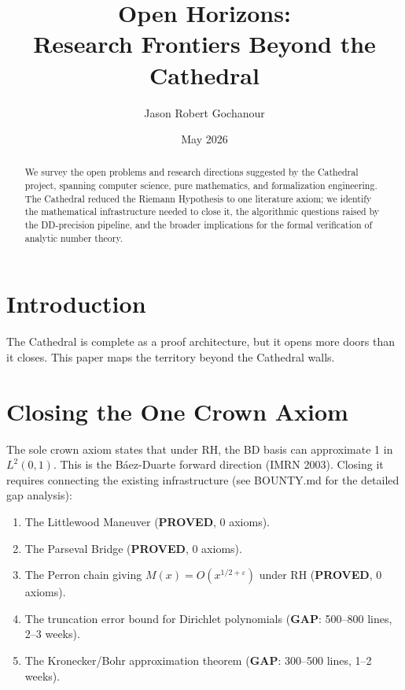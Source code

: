 \documentclass[11pt,a4paper]{article}
\title{%
  Open Horizons:\\
  Research Frontiers Beyond the Cathedral%
}
\author{Jason Robert Gochanour}
\date{May 2026}
\begin{document}
\maketitle

\begin{abstract}
We survey the open problems and research directions suggested by
the Cathedral project, spanning computer science, pure mathematics,
and formalization engineering. The Cathedral reduced the Riemann
Hypothesis to one literature axiom; we identify the mathematical
infrastructure needed to close it, the algorithmic questions raised by the
DD-precision pipeline, and the broader implications for the formal
verification of analytic number theory.
\end{abstract}

\tableofcontents

\section{Introduction}

The Cathedral is complete as a proof architecture, but it opens
more doors than it closes. This paper maps the territory beyond
the Cathedral walls.

\section{Closing the One Crown Axiom}

The sole crown axiom  states that under
RH, the BD basis can approximate 1 in $L^2(0,1)$. This is the
B\'aez-Duarte forward direction (IMRN 2003). Closing it requires
connecting the existing infrastructure (see BOUNTY.md for the
detailed gap analysis):

\begin{enumerate}
  \item The Littlewood Maneuver (\textbf{PROVED}, 0 axioms).
  \item The Parseval Bridge (\textbf{PROVED}, 0 axioms).
  \item The Perron chain giving $M(x) = O(x^{1/2+\varepsilon})$
    under RH (\textbf{PROVED}, 0 axioms).
  \item The truncation error bound for Dirichlet polynomials
    (\textbf{GAP}: 500--800 lines, 2--3 weeks).
  \item The Kronecker/Bohr approximation theorem
    (\textbf{GAP}: 300--500 lines, 1--2 weeks).
\end{enumerate}
\end{document}
